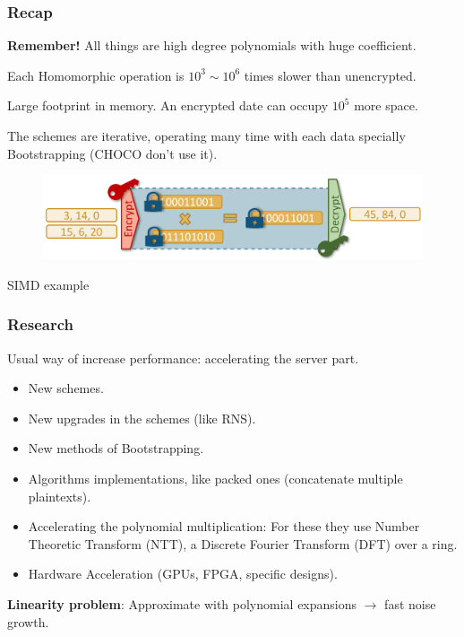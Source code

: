 \documentclass[10pt,handout]{beamer}
\begin{document}

\begin{frame}
\frametitle{Recap}

    \textbf{Remember!} All things are high degree polynomials with huge coefficient.


Each Homomorphic operation is $10^3 \sim 10^6$ times slower than unencrypted.
\pause

Large footprint in memory.
An encrypted date can occupy $10^5$ more space.

\pause
    The schemes are iterative, operating many time with each data specially Bootstrapping (CHOCO don't use it).

        \begin{figure}[h!]
            \centering
            \includegraphics[scale=0.8]{workflow.png}
        \end{figure}
    \centering
        SIMD example


\end{frame}


\begin{frame}
\frametitle{Research}

    Usual way of increase performance:  accelerating the server part.
\pause
\begin{itemize}\itemsep-0.7em
   \item New schemes.
   \item New upgrades in the schemes (like RNS).
   \item New methods of Bootstrapping.
\pause
   \item Algorithms implementations, like packed ones (concatenate multiple plaintexts).
   \item Accelerating the polynomial multiplication:
       For these they use Number Theoretic Transform (NTT), a Discrete Fourier Transform (DFT) over a ring.
   \item Hardware Acceleration (GPUs, FPGA, specific designs).
\end{itemize}
\pause

    \textbf{Linearity problem}: Approximate with polynomial expansions $\rightarrow$ fast noise growth.
\end{frame}
\end{document}
